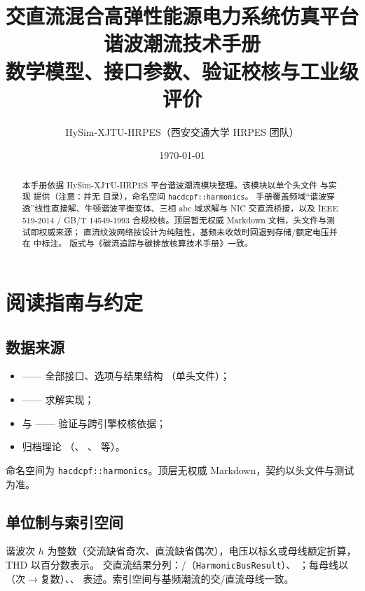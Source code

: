 \documentclass[UTF8,fontset=fandol,a4paper,11pt]{ctexart}
\title{\textbf{交直流混合高弹性能源电力系统仿真平台}\\[0.5em]
       {\Large 谐波潮流技术手册}\\[0.3em]
       {\large 数学模型、接口参数、验证校核与工业级评价}}
\author{HySim-XJTU-HRPES（西安交通大学 HRPES 团队）}
\date{\today}
\begin{document}
\maketitle
\begin{abstract}
\noindent 本手册依据 HySim-XJTU-HRPES 平台谐波潮流模块整理。该模块以单个头文件
 与实现
 提供（注意：并无
 目录），命名空间 \texttt{hacdcpf::harmonics}。
手册覆盖频域“谐波穿透”线性直接解、牛顿谐波平衡变体、三相 abc 域求解与 NIC 交直流桥接，以及
IEEE 519-2014 / GB/T 14549-1993 合规校核。顶层暂无权威 Markdown 文档，头文件与测试即权威来源；
直流纹波网络按设计为纯阻性，基频未收敛时回退到存储/额定电压并在  中标注。
版式与《碳流追踪与碳排放核算技术手册》一致。
\end{abstract}

\tableofcontents
\newpage

\section{阅读指南与约定}
\subsection{数据来源}
\begin{itemize}
  \item {} —— 全部接口、选项与结果结构
        （单头文件）；
  \item {} —— 求解实现；
  \item {} 与 
        —— 验证与跨引擎校核依据；
  \item 归档理论 （、
        、 等）。
\end{itemize}
命名空间为 \texttt{hacdcpf::harmonics}。顶层无权威 Markdown，契约以头文件与测试为准。

\subsection{单位制与索引空间}
谐波次 $h$ 为整数（交流缺省奇次、直流缺省偶次），电压以标幺或母线额定折算，THD 以百分数表示。
交直流结果分列：/（\texttt{HarmonicBusResult}）、
；每母线以 （次$\to$复数）、、
表述。索引空间与基频潮流的交/直流母线一致。
\end{document}
